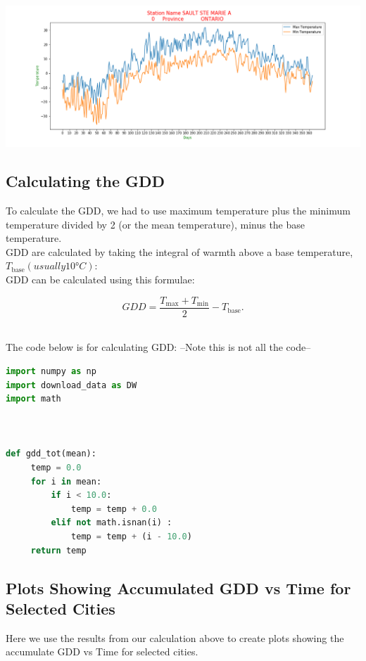 \includegraphics[scale=0.35]{Fig_50092_2015.png}

\subsection{Calculating the GDD}

To calculate the GDD, we had to use maximum temperature plus the minimum temperature divided by 2 (or the mean temperature), minus the base temperature.\\
GDD are calculated by taking the integral of warmth above a base temperature, $T_{{\mathrm  {base}}} (usually 10 °C):$\\
GDD can be calculated using this formulae:

$$GDD={\frac  {T_{{\mathrm  {max}}}+T_{{\mathrm  {min}}}}{2}}-T_{{\mathrm  {base}}}. $$\

The code below is for calculating GDD:
--Note this is not all the code--

\begin{lstlisting}[language=Python]
import numpy as np
import download_data as DW
import math



def gdd_tot(mean):
     temp = 0.0
     for i in mean:
         if i < 10.0:
             temp = temp + 0.0
         elif not math.isnan(i) :
             temp = temp + (i - 10.0)
     return temp

\end{lstlisting}

\subsection{Plots Showing Accumulated GDD vs Time for\\ Selected Cities}

Here we use the results from our calculation above to create plots showing the accumulate GDD vs Time for selected cities. 

